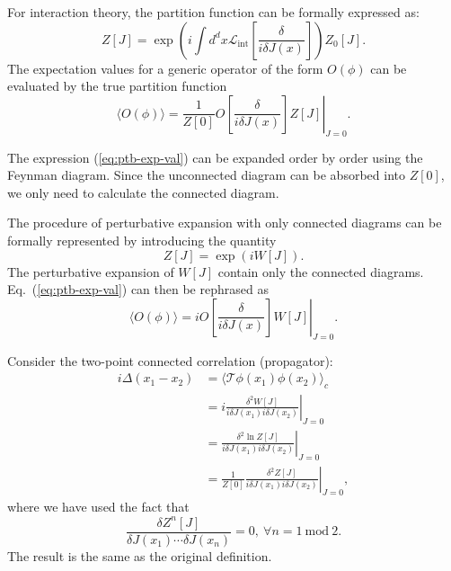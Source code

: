For interaction theory, the partition function can be formally expressed as:
\begin{equation}
	Z[J] = \exp\left(i\int d^dx \mathcal{L}_{\mathrm{int}}\left[\frac{\delta}{i\delta J(x)}\right]\right)Z_0[J].
\end{equation}
The expectation values for a generic operator of the form $O(\phi)$ can be evaluated by the true partition function
\begin{equation}
	\langle O(\phi)\rangle
	= \frac{1}{Z[0]} \left. O\left[\frac{\delta}{i\delta J(x)}\right] Z[J] \right|_{J=0}.
	\label{eq:ptb-exp-val}
\end{equation}

The expression (\ref{eq:ptb-exp-val}) can be expanded order by order using the Feynman diagram. 
Since the unconnected diagram can be absorbed into $Z[0]$, we only need to calculate the connected diagram.

The procedure of perturbative expansion with only connected diagrams can be formally represented by introducing the quantity
\begin{equation}
	Z[J] = \exp\left(i W[J]\right).
\end{equation}
The perturbative expansion of $W[J]$ contain only the connected diagrams.
Eq.~(\ref{eq:ptb-exp-val}) can then be rephrased as
\begin{equation}
	\langle O(\phi)\rangle
	= i\left. O\left[\frac{\delta}{i\delta J(x)}\right] W[J] \right|_{J=0}.
\end{equation}

\begin{framedexpl}
Consider the two-point connected correlation (propagator):
\begin{equation*}
\begin{aligned}
	i\Delta(x_1-x_2)
	&= \langle \mathcal{T}\phi(x_1) \phi(x_2)\rangle_c \\
	&= i\left.\frac{\delta^2 W[J]}{i\delta J(x_1) i\delta J(x_2)}\right|_{J=0} \\
	&= \left.\frac{\delta^2 \ln Z[J]}{i\delta J(x_1) i\delta J(x_2)}\right|_{J=0}\\
	&= \frac{1}{Z[0]}\left.\frac{\delta^2 Z[J]}{i\delta J(x_1)i\delta J(x_2)}\right|_{J=0},
\end{aligned}
\end{equation*}
where we have used the fact that
\begin{equation*}
	\frac{\delta Z^n[J]}{\delta J(x_1) \cdots \delta J(x_n)} = 0,\ \forall n = 1\ \mathrm{mod}\ 2.
\end{equation*}
The result is the same as the original definition.
\end{framedexpl}

